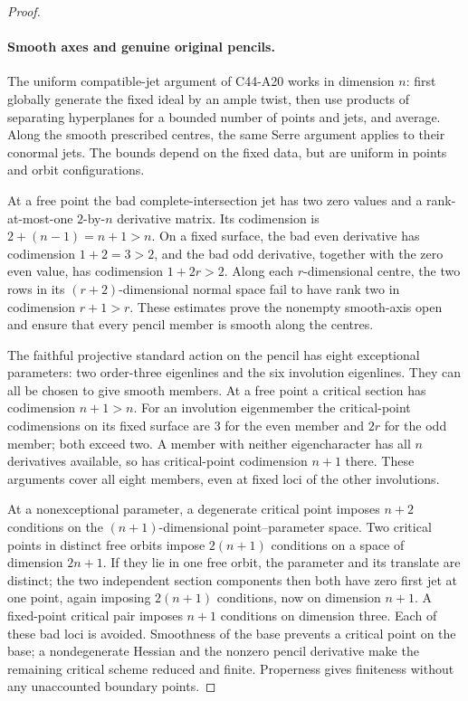 \documentclass[11pt]{article}
\theoremstyle{remark}\newtheorem{remark}[theorem]{Remark}
\begin{document}
\begin{proof}
\paragraph{Smooth axes and genuine original pencils.}
The uniform compatible-jet argument of C44-A20 works in dimension $n$:
first globally generate the fixed ideal by an ample twist, then use
products of separating hyperplanes for a bounded number of points and
jets, and average.  Along the smooth prescribed centres, the same
Serre argument applies to their conormal jets.  The bounds depend on
the fixed data, but are uniform in points and orbit configurations.

At a free point the bad complete-intersection jet has two zero values
and a rank-at-most-one $2$-by-$n$ derivative matrix.  Its codimension
is $2+(n-1)=n+1>n$.  On a fixed surface, the bad even derivative has
codimension $1+2=3>2$, and the bad odd derivative, together with the
zero even value, has codimension $1+2r>2$.  Along each $r$-dimensional
centre, the two rows in its $(r+2)$-dimensional normal space fail to
have rank two in codimension $r+1>r$.  These estimates prove the
nonempty smooth-axis open and ensure that every pencil member is
smooth along the centres.

The faithful projective standard action on the pencil has eight
exceptional parameters: two order-three eigenlines and the six
involution eigenlines.  They can all be chosen to give smooth members.
At a free point a critical section has codimension $n+1>n$.
For an involution eigenmember the critical-point codimensions on its
fixed surface are $3$ for the even member and $2r$ for the odd member;
both exceed two.  A member with neither eigencharacter has all $n$
derivatives available, so has critical-point codimension $n+1$ there.
These arguments cover all eight members, even at fixed loci of the
other involutions.

At a nonexceptional parameter, a degenerate critical point imposes
$n+2$ conditions on the $(n+1)$-dimensional point--parameter space.
Two critical points in distinct free orbits impose $2(n+1)$ conditions
on a space of dimension $2n+1$.  If they lie in one free orbit, the
parameter and its translate are distinct; the two independent section
components then both have zero first jet at one point, again imposing
$2(n+1)$ conditions, now on dimension $n+1$.  A fixed-point critical
pair imposes $n+1$ conditions on dimension three.  Each of these bad
loci is avoided.  Smoothness of the base prevents a critical point on
the base; a nondegenerate Hessian and the nonzero pencil derivative
make the remaining critical scheme reduced and finite.  Properness
gives finiteness without any unaccounted boundary points.


\end{proof}
\end{document}

